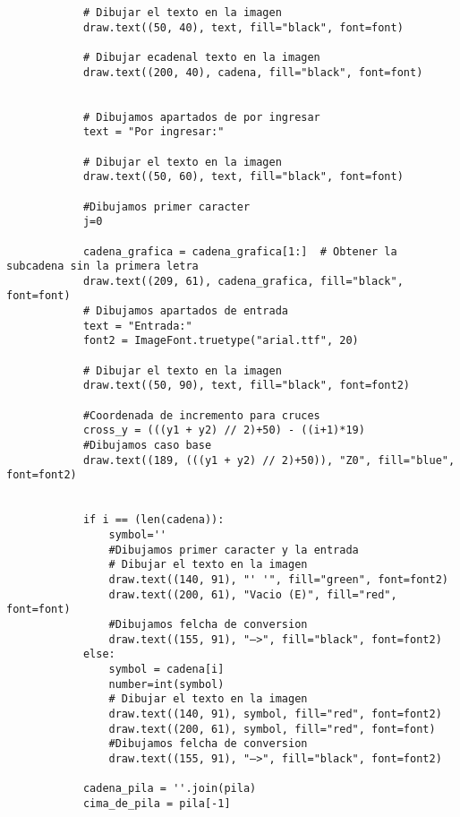 \begin{enumerate}
\begin{lstlisting}
            # Dibujar el texto en la imagen
            draw.text((50, 40), text, fill="black", font=font)
            
            # Dibujar ecadenal texto en la imagen 
            draw.text((200, 40), cadena, fill="black", font=font) 
            
            
            # Dibujamos apartados de por ingresar
            text = "Por ingresar:"

            # Dibujar el texto en la imagen
            draw.text((50, 60), text, fill="black", font=font)
            
            #Dibujamos primer caracter
            j=0
            
            cadena_grafica = cadena_grafica[1:]  # Obtener la subcadena sin la primera letra
            draw.text((209, 61), cadena_grafica, fill="black", font=font)
            # Dibujamos apartados de entrada
            text = "Entrada:"
            font2 = ImageFont.truetype("arial.ttf", 20)

            # Dibujar el texto en la imagen
            draw.text((50, 90), text, fill="black", font=font2)
            
            #Coordenada de incremento para cruces
            cross_y = (((y1 + y2) // 2)+50) - ((i+1)*19)
            #Dibujamos caso base
            draw.text((189, (((y1 + y2) // 2)+50)), "Z0", fill="blue", font=font2)
            
            
            if i == (len(cadena)):
                symbol=''
                #Dibujamos primer caracter y la entrada
                # Dibujar el texto en la imagen
                draw.text((140, 91), "' '", fill="green", font=font2)
                draw.text((200, 61), "Vacio (E)", fill="red", font=font)
                #Dibujamos felcha de conversion
                draw.text((155, 91), "—>", fill="black", font=font2)
            else:
                symbol = cadena[i]
                number=int(symbol)
                # Dibujar el texto en la imagen
                draw.text((140, 91), symbol, fill="red", font=font2)
                draw.text((200, 61), symbol, fill="red", font=font)
                #Dibujamos felcha de conversion
                draw.text((155, 91), "—>", fill="black", font=font2)
                
            cadena_pila = ''.join(pila)
            cima_de_pila = pila[-1]
            

\end{lstlisting}
\end{enumerate}
